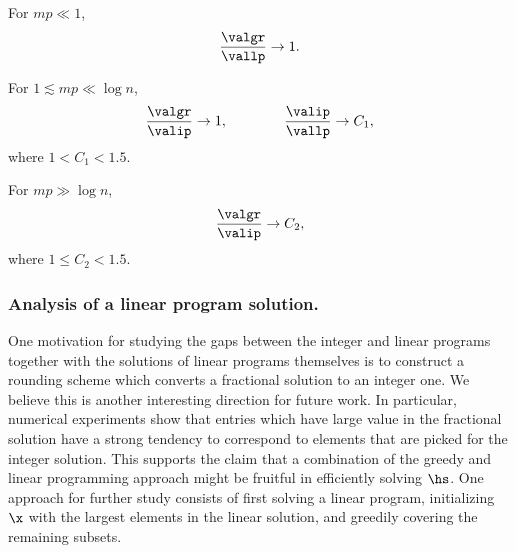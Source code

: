 \begin{conjecture}
For \(mp \ll 1\),
\begin{equation}
    \frac{\valgr}{\vallp} \to 1.
\end{equation}
\end{conjecture}
\begin{conjecture}[Sparse]
For \(1 \lesssim mp \ll \log n\),
\begin{equation}
    \frac{\valgr}{\valip} \to 1, \qquad \qquad \frac{\valip}{\vallp} \to C_1,
\end{equation}
where \(1 < C_1 < 1.5\).
\end{conjecture}
\begin{conjecture}[Dense]
    For \(mp \gg \log n\),
    \begin{equation}
        \frac{\valgr}{\valip} \to C_2,
    \end{equation}
    where \(1 \leq C_2 < 1.5\).
\end{conjecture}
\subsubsection{Analysis of a linear program solution.}
One motivation for studying the gaps between the integer and linear programs together with the solutions of linear programs themselves is to construct a rounding scheme which converts a fractional solution to an integer one. 
We believe this is another interesting direction for future work. 
In particular, numerical experiments show that entries which have large value in the fractional solution have a strong tendency to correspond to elements that are picked for the integer solution. 
This supports the claim that a combination of the greedy and linear programming approach might be fruitful in efficiently solving $\hs$. 
One approach for further study consists of first solving a linear program, initializing $\x$ with the largest elements in the linear solution, and greedily covering the remaining subsets. 
